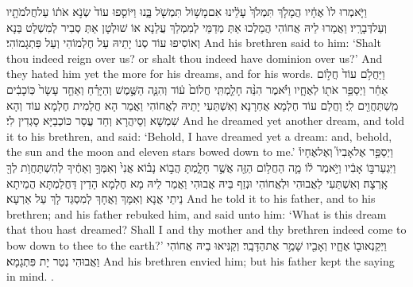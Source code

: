 {וַיֹּ֤אמְרוּ לוֹ֙ אֶחָ֔יו הֲמָלֹ֤ךְ תִּמְלֹךְ֙ עָלֵ֔ינוּ אִם\maqqaf מָשׁ֥וֹל תִּמְשֹׁ֖ל בָּ֑נוּ וַיּוֹסִ֤פוּ עוֹד֙ שְׂנֹ֣א אֹת֔וֹ עַל\maqqaf חֲלֹמֹתָ֖יו וְעַל\maqqaf דְּבָרָֽיו׃}
{וַאֲמַרוּ לֵיהּ אֲחוֹהִי הֲמַלְכוּ אַתְּ מְדַמֵּי לְמִמְלַךְ עֲלַנָא אוֹ שׁוּלְטָן אַתְּ סְבִיר לְמִשְׁלַט בַּנָא וְאוֹסִיפוּ עוֹד סְנוֹ יָתֵיהּ עַל חֶלְמוֹהִי וְעַל פִּתְגָמוֹהִי׃}
{And his brethren said to him: ‘Shalt thou indeed reign over us? or shalt thou indeed have dominion over us?’ And they hated him yet the more for his dreams, and for his words.}{}
{וַיַּחֲלֹ֥ם עוֹד֙ חֲל֣וֹם אַחֵ֔ר וַיְסַפֵּ֥ר אֹת֖וֹ לְאֶחָ֑יו וַיֹּ֗אמֶר הִנֵּ֨ה חָלַ֤מְתִּֽי חֲלוֹם֙ ע֔וֹד וְהִנֵּ֧ה הַשֶּׁ֣מֶשׁ וְהַיָּרֵ֗חַ וְאַחַ֤ד עָשָׂר֙ כּֽוֹכָבִ֔ים מִֽשְׁתַּחֲוִ֖ים לִֽי׃}
{וַחֲלַם עוֹד חֶלְמָא אֻחְרָנָא וְאִשְׁתַּעִי יָתֵיהּ לְאֲחוֹהִי וַאֲמַר הָא חֲלַמִית חֶלְמָא עוֹד וְהָא שִׁמְשָׁא וְסֵיהֲרָא וְחַד עֲסַר כּוֹכְבַיָּא סָגְדִין לִי׃}
{And he dreamed yet another dream, and told it to his brethren, and said: ‘Behold, I have dreamed yet a dream: and, behold, the sun and the moon and eleven stars bowed down to me.’}{}
{וַיְסַפֵּ֣ר אֶל\maqqaf אָבִיו֮ וְאֶל\maqqaf אֶחָיו֒ וַיִּגְעַר\maqqaf בּ֣וֹ אָבִ֔יו וַיֹּ֣אמֶר ל֔וֹ מָ֛ה הַחֲל֥וֹם הַזֶּ֖ה אֲשֶׁ֣ר חָלָ֑מְתָּ הֲב֣וֹא נָב֗וֹא אֲנִי֙ וְאִמְּךָ֣ וְאַחֶ֔יךָ לְהִשְׁתַּחֲוֺ֥ת לְךָ֖ אָֽרְצָה׃}
{וְאִשְׁתַּעִי לַאֲבוּהִי וּלְאֲחוֹהִי וּנְזַף בֵּיהּ אֲבוּהִי וַאֲמַר לֵיהּ מָא חֶלְמָא הָדֵין דַּחֲלַמְתָּא הֲמֵיתָא נֵיתֵי אֲנָא וְאִמָּךְ וַאֲחָךְ לְמִסְגַּד לָךְ עַל אַרְעָא׃}
{And he told it to his father, and to his brethren; and his father rebuked him, and said unto him: ‘What is this dream that thou hast dreamed? Shall I and thy mother and thy brethren indeed come to bow down to thee to the earth?’}{}
{וַיְקַנְאוּ\maqqaf ב֖וֹ אֶחָ֑יו וְאָבִ֖יו שָׁמַ֥ר אֶת\maqqaf הַדָּבָֽר׃}
{וְקַנִּיאוּ בֵיהּ אֲחוֹהִי וַאֲבוּהִי נְטַר יָת פִּתְגָמָא׃}
{And his brethren envied him; but his father kept the saying in mind. .}{}

